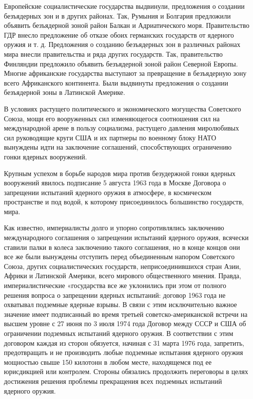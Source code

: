 \documentclass[12pt, a4paper, openany]{book}
\begin{document}
	Европейские социалистические государства выдвинули, предложения о создании безъядерных зон и в других районах. Так, Румыния и Болгария предложили объявить безъядерной зоной район Балкан и Адриатического моря. Правительство ГДР внесло предложение об отказе обоих германских государств от ядерного оружия и т. д. Предложения о созданию безъядерных зон в различных районах мира внесли правительства и ряда других государств. Так, правительство Финляндии предложило объявить безъядерной зоной район Северной Европы. Многие африканские государства выступают за превращение в безъядерную зону всего Африканского континента. Были выдвинуты предложения о создании безъядерной зоны в Латинской Америке.
	
	В условиях растущего политического и экономического могущества Советского Союза, мощи его вооруженных сил изменяющегося соотношения сил на международной арене в пользу социализма, растущего давления миролюбивых сил руководящие круги США и их партнеры по военному блоку НАТО вынуждены идти на заключение соглашений, способствующих ограничению гонки ядерных вооружений.
	
	Крупным успехом в борьбе народов мира против безудержной гонки ядерных вооружений явилось подписание 5 августа 1963 года в Москве Договора о запрещении испытаний ядерного оружия в атмосфере, в космическом пространстве и под водой, к которому присоединилось большинство государств, мира.
	
	Как известно, империалисты долго и упорно сопротивлялись заключению международного соглашения о запрещении испытаний ядерного оружия, всячески ставили палки в колеса заключению такого соглашения, но в конце концов они все же были вынуждены отступить перед объединенным напором Советского Союза, других социалистических государств, неприсоединившихся стран Азии, Африки и Латинской Америки, всего мирового общественного мнения. Правда, империалистические «государства все же уклонились при этом от полного решения вопроса о запрещении ядерных испытаний: договор 1963 года не охватывал подземные ядерные взрывы. В связи с этим исключительно важное значение имеет подписанный во время третьей советско-американской встречи на высшем уровне с 27 июня по 3 июля 1974 года Договор между СССР и США об ограничении подземных испытаний ядерного оружия. В соответствии с этим договором каждая из сторон обязуется, начиная с 31 марта 1976 года, запретить, предотвращать и не производить любые подземные испытания ядерного оружия мощностью свыше 150 килотонн в любом месте, находящемся под ее юрисдикцией или контролем. Стороны обязались продолжить переговоры в целях достижения решения проблемы прекращения всех подземных испытаний ядерного оружия.
	
\end{document}
